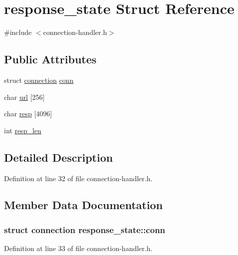 \hypertarget{structresponse__state}{\section{response\-\_\-state Struct Reference}
\label{structresponse__state}
}


{\ttfamily \#include $<$connection-\/handler.\-h$>$}

\subsection*{Public Attributes}
\begin{DoxyCompactItemize}
\item 
struct \hyperlink{structconnection}{connection} \hyperlink{structresponse__state_ac1ab399c44d920b03094a1f86b999cf2}{conn}
\item 
char \hyperlink{structresponse__state_a8f1c401abbed7387d7e60181d0cb2791}{url} \mbox{[}256\mbox{]}
\item 
char \hyperlink{structresponse__state_afb106346ba6cd2fbbd890c8ec9540876}{resp} \mbox{[}4096\mbox{]}
\item 
int \hyperlink{structresponse__state_ae88a2831ab15e9936f7eff929ee907c4}{resp\-\_\-len}
\end{DoxyCompactItemize}


\subsection{Detailed Description}


Definition at line 32 of file connection-\/handler.\-h.



\subsection{Member Data Documentation}
\hypertarget{structresponse__state_ac1ab399c44d920b03094a1f86b999cf2}{
\subsubsection[{conn}]{\setlength{\rightskip}{0pt plus 5cm}struct {\bf connection} response\-\_\-state\-::conn}}\label{structresponse__state_ac1ab399c44d920b03094a1f86b999cf2}


Definition at line 33 of file connection-\/handler.\-h.

